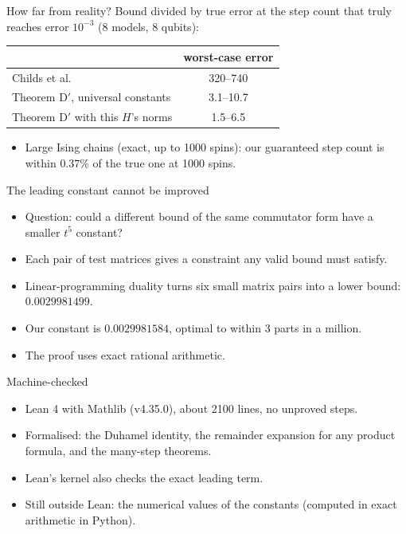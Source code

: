 \documentclass[11pt,aspectratio=169]{beamer}
\begin{document}
\begin{frame}{How far from reality?}
Bound divided by true error at the step count that truly reaches error $10^{-3}$ (8 models, 8 qubits):
\begin{center}
\begin{tabular}{@{}lc@{}}
\toprule
& worst-case error\\
\midrule
Childs et al. & 320--740\\
\pause Theorem D$'$, universal constants & 3.1--10.7\\
\pause Theorem D$'$ with this $H$'s norms & 1.5--6.5\\
\bottomrule
\end{tabular}
\end{center}
\begin{itemize}[<+->]
\item Large Ising chains (exact, up to 1000 spins): our guaranteed step count is within $0.37\%$ of the true one at 1000 spins.
\end{itemize}
\end{frame}

\begin{frame}{The leading constant cannot be improved}
\begin{itemize}[<+->]
\item Question: could a different bound of the same commutator form have a smaller $t^5$ constant?
\item Each pair of test matrices gives a constraint any valid bound must satisfy.
\item Linear-programming duality turns six small matrix pairs into a lower bound: $0.0029981499$.
\item Our constant is $0.0029981584$, optimal to within 3 parts in a million.
\item The proof uses exact rational arithmetic.
\end{itemize}
\end{frame}

\begin{frame}{Machine-checked}
\begin{itemize}[<+->]
\item Lean 4 with Mathlib (v4.35.0), about 2100 lines, no unproved steps.
\item Formalised: the Duhamel identity, the remainder expansion for any product formula, and the many-step theorems.
\item Lean's kernel also checks the exact leading term.
\item Still outside Lean: the numerical values of the constants (computed in exact arithmetic in Python).
\end{itemize}
\end{frame}
\end{document}
